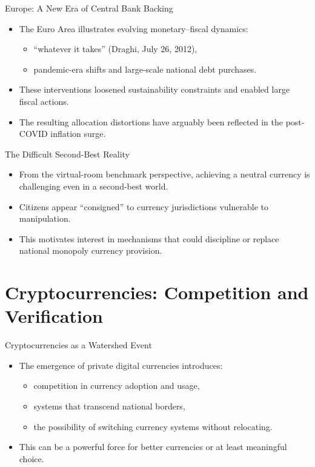 \documentclass[11pt,aspectratio=169]{beamer}
\begin{document}
\begin{frame}{Europe: A New Era of Central Bank Backing}
\small
\begin{itemize}
  \item The Euro Area illustrates evolving monetary--fiscal dynamics:
  \begin{itemize}
    \item ``whatever it takes'' (Draghi, July 26, 2012),
    \item pandemic-era shifts and large-scale national debt purchases.
  \end{itemize}
  \item These interventions loosened sustainability constraints and enabled large fiscal actions.
  \item The resulting allocation distortions have arguably been reflected in the post-COVID inflation surge.
\end{itemize}
\end{frame}

\begin{frame}{The Difficult Second-Best Reality}
\small
\begin{itemize}
  \item From the virtual-room benchmark perspective, achieving a neutral currency is challenging even in a second-best world.
  \item Citizens appear ``consigned'' to currency jurisdictions vulnerable to manipulation.
  \item This motivates interest in mechanisms that could discipline or replace national monopoly currency provision.
\end{itemize}
\end{frame}

\section{Cryptocurrencies: Competition and Verification}

\begin{frame}{Cryptocurrencies as a Watershed Event}
\small
\begin{itemize}
  \item The emergence of private digital currencies introduces:
  \begin{itemize}
    \item competition in currency adoption and usage,
    \item systems that transcend national borders,
    \item the possibility of switching currency systems without relocating.
  \end{itemize}
  \item This can be a powerful force for better currencies or at least meaningful choice.
\end{itemize}
\end{frame}
\end{document}
